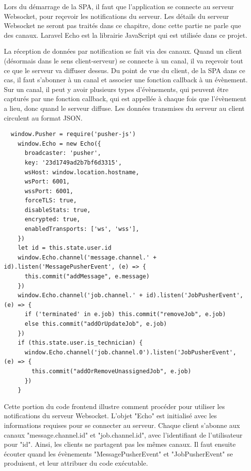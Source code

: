 \documentclass[
    iai, %
    eai, %
]{heig-tb}
\begin{document}
\newpage
Lors du démarrage de la SPA, il faut que l'application se connecte au serveur Websocket, pour reçevoir les notifications du serveur.
Les détails du serveur Websocket ne seront pas traités dans ce chapitre, donc cette partie ne parle que des canaux. Laravel Echo est la librairie JavaScript qui est utilisée dans ce projet.

La réception de données par notification se fait via des canaux. Quand un client (désormais dans le sens client-serveur) se connecte à un canal, il va reçevoir tout ce que le serveur va diffuser dessus. Du point de vue du client, de la SPA dans ce cas, il faut s'abonner à un canal et associer une fonction callback à un évènement. Sur un canal, il peut y avoir plusieurs types d'évènements, qui peuvent être capturés par une fonction callback, qui est appellée à chaque fois que l'évènement a lieu, donc quand le serveur diffuse. Les données transmises du serveur au client circulent au format JSON.

\begin{verbatim}
  window.Pusher = require('pusher-js')
    window.Echo = new Echo({
      broadcaster: 'pusher',
      key: '23d1749ad2b7bf6d3315',
      wsHost: window.location.hostname,
      wsPort: 6001,
      wssPort: 6001,
      forceTLS: true,
      disableStats: true,
      encrypted: true,
      enabledTransports: ['ws', 'wss'],
    })
    let id = this.state.user.id
    window.Echo.channel('message.channel.' + id).listen('MessagePusherEvent', (e) => {
      this.commit("addMessage", e.message)
    })
    window.Echo.channel('job.channel.' + id).listen('JobPusherEvent', (e) => {
      if ('terminated' in e.job) this.commit("removeJob", e.job)
      else this.commit("addOrUpdateJob", e.job)
    })
    if (this.state.user.is_technician) {
      window.Echo.channel('job.channel.0').listen('JobPusherEvent', (e) => {
        this.commit("addOrRemoveUnassignedJob", e.job)
      })
    }
\end{verbatim}

Cette portion du code frontend illustre comment procéder pour utiliser les notifications du serveur Websocket. L'objet "Echo" est initialisé avec les informations requises pour se connecter au serveur. Chaque client s'abonne aux canaux "message.channel.{id}" et "job.channel.{id}", avec l'identifiant de l'utilisateur pour "{id}". Ainsi, les clients ne partagent pas les mêmes canaux. Il faut ensuite écouter quand les évènements "MessagePusherEvent" et "JobPusherEvent" se produisent, et leur attribuer du code exécutable.
\end{document}
